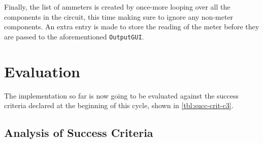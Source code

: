 
    Finally, the list of ammeters is created by once-more looping over all the components in the circuit, this time making sure to ignore any non-meter components.
    An extra entry is made to store the reading of the meter before they are passed to the aforementioned \verb|OutputGUI|.

\section{Evaluation}
    The implementation so far is now going to be evaluated against the success criteria declared at the beginning of this cycle, shown in \autoref{tbl:succ-crit-c3}. 

    \subsection{Analysis of Success Criteria}
